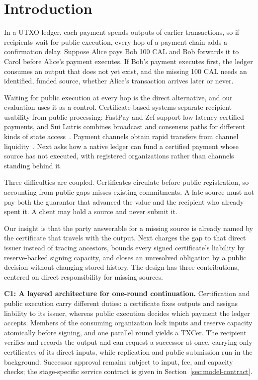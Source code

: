 \section{Introduction}
\label{sec:introduction}

In a UTXO ledger, each payment spends outputs of earlier transactions, so if recipients wait for public execution, every hop of a payment chain adds a confirmation delay. Suppose Alice pays Bob 100 CAL and Bob forwards it to Carol before Alice's payment executes. If Bob's payment executes first, the ledger consumes an output that does not yet exist, and the missing 100 CAL needs an identified, funded source, whether Alice's transaction arrives later or never.

Waiting for public execution at every hop is the direct alternative, and our evaluation uses it as a control. Certificate-based systems separate recipient usability from public processing: FastPay and Zef support low-latency certified payments, and Sui Lutris combines broadcast and consensus paths for different kinds of state access~\cite{fastpay,zef,lutris}. Payment channels obtain rapid transfers from channel liquidity~\cite{blitz,donner}. Next asks how a native ledger can fund a certified payment whose source has not executed, with registered organizations rather than channels standing behind it.

Three difficulties are coupled. Certificates circulate before public registration, so accounting from public gaps misses existing commitments. A late source must not pay both the guarantor that advanced the value and the recipient who already spent it. A client may hold a source and never submit it.

Our insight is that the party answerable for a missing source is already named by the certificate that travels with the output. Next charges the gap to that direct issuer instead of tracing ancestors, bounds every signed certificate's liability by reserve-backed signing capacity, and closes an unresolved obligation by a public decision without changing stored history. The design has three contributions, centered on direct responsibility for missing sources.

\noindent\textbf{C1: A layered architecture for one-round continuation.} Certification and public execution carry different duties: a certificate fixes outputs and assigns liability to its issuer, whereas public execution decides which payment the ledger accepts. Members of the consuming organization lock inputs and reserve capacity atomically before signing, and one parallel round yields a TXCer. The recipient verifies and records the output and can request a successor at once, carrying only certificates of its direct inputs, while replication and public submission run in the background. Successor approval remains subject to input, fee, and capacity checks; the stage-specific service contract is given in Section~\ref{sec:model-contract}.

